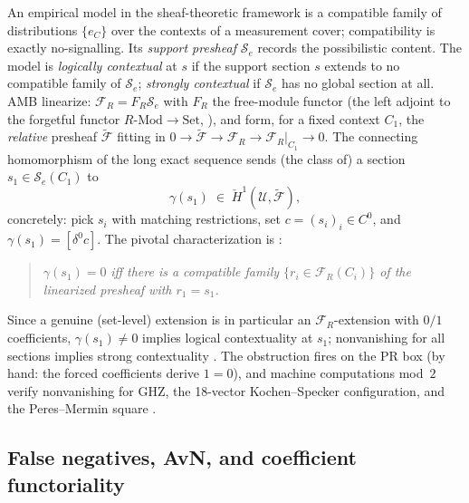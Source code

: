\documentclass[11pt]{article}
\newcommand{\Hc}[1]{\check{H}^{#1}}
\newcommand{\FR}{\mathcal{F}_R}
\newcommand{\Sec}{\mathcal{S}}
\begin{document}
An empirical model in the sheaf-theoretic framework
\citep{abramsky2011sheaf} is a compatible family of distributions
$\{e_C\}$ over the contexts of a measurement cover; compatibility is
exactly no-signalling.  Its \emph{support presheaf} $\Sec_e$ records
the possibilistic content.  The model is \emph{logically contextual}
at $s$ if the support section $s$ extends to no compatible family of
$\Sec_e$; \emph{strongly contextual} if $\Sec_e$ has no global
section at all.  AMB \citep{abramsky2012cohomology} linearize:
$\FR = F_R \Sec_e$ with $F_R$ the free-module functor (the left
adjoint to the forgetful functor $R\text{-Mod} \to \mathrm{Set}$,
\citealp[Def.~17]{abramsky2015paradox}), and form, for a fixed context
$C_1$, the \emph{relative} presheaf $\tilde{\mathcal{F}}$ fitting in
$0 \to \tilde{\mathcal{F}} \to \FR \to \FR|_{C_1} \to 0$.  The
connecting homomorphism of the long exact sequence sends (the class
of) a section $s_1 \in \Sec_e(C_1)$ to
\[
\gamma(s_1) \;\in\; \Hc{1}(\mathcal{U}, \tilde{\mathcal{F}}),
\]
concretely: pick $s_i$ with matching restrictions, set $c = (s_i)_i
\in C^0$, and $\gamma(s_1) = [\delta^0 c]$.  The pivotal
characterization is
\citep[Prop.~4.2]{abramsky2012cohomology}:
\begin{quote}
$\gamma(s_1) = 0$ \emph{iff there is a compatible family $\{r_i \in
\FR(C_i)\}$ of the linearized presheaf with $r_1 = s_1$.}
\end{quote}
Since a genuine (set-level) extension is in particular an
$\FR$-extension with $0/1$ coefficients, $\gamma(s_1) \neq 0$ implies
logical contextuality at $s_1$; nonvanishing for all sections implies
strong contextuality \citep[Prop.~4.3]{abramsky2012cohomology}.  The
obstruction fires on the PR box (by hand: the forced coefficients
derive $1 = 0$), and machine computations mod~$2$ verify nonvanishing
for GHZ, the 18-vector Kochen--Specker configuration, and the
Peres--Mermin square \citep{abramsky2012cohomology}.

\subsection{False negatives, AvN, and coefficient functoriality}
\label{sec:falseneg}
\end{document}
